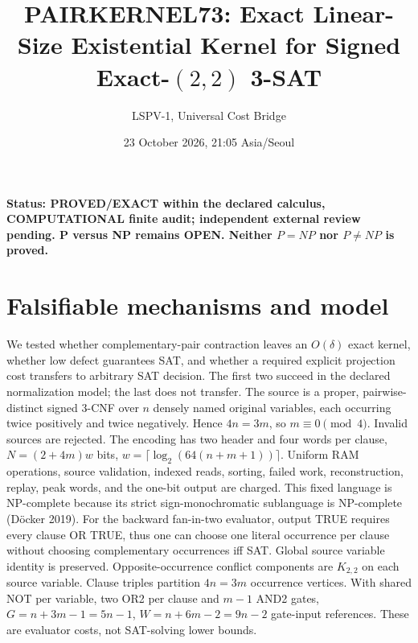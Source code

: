 \documentclass[11pt]{article}
\title{PAIRKERNEL73: Exact Linear-Size Existential Kernel for Signed Exact-$(2,2)$ 3-SAT}
\author{LSPV-1, Universal Cost Bridge}
\date{23 October 2026, 21:05 Asia/Seoul}
\begin{document}
\maketitle
\noindent\textbf{Status: PROVED/EXACT within the declared calculus, COMPUTATIONAL finite audit; independent external review pending. P versus NP remains OPEN. Neither $P=NP$ nor $P\ne NP$ is proved.}

\section{Falsifiable mechanisms and model}
We tested whether complementary-pair contraction leaves an $O(\delta)$ exact kernel, whether low defect guarantees SAT, and whether a required explicit projection cost transfers to arbitrary SAT decision. The first two succeed in the declared normalization model; the last does not transfer.
The source is a proper, pairwise-distinct signed 3-CNF over $n$ densely named original variables, each occurring twice positively and twice negatively. Hence $4n=3m$, so $m\equiv0\pmod4$. Invalid sources are rejected. The encoding has two header and four words per clause, $N=(2+4m)w$ bits, $w=\lceil\log_2(64(n+m+1))\rceil$. Uniform RAM operations, source validation, indexed reads, sorting, failed work, reconstruction, replay, peak words, and the one-bit output are charged. This fixed language is NP-complete because its strict sign-monochromatic sublanguage is NP-complete (D\"ocker 2019).
For the backward fan-in-two evaluator, output TRUE requires every clause OR TRUE, thus one can choose one literal occurrence per clause without choosing complementary occurrences iff SAT. Global source variable identity is preserved. Opposite-occurrence conflict components are $K_{2,2}$ on each source variable. Clause triples partition $4n=3m$ occurrence vertices. With shared NOT per variable, two OR2 per clause and $m-1$ AND2 gates, $G=n+3m-1=5n-1$, $W=n+6m-2=9n-2$ gate-input references. These are evaluator costs, not SAT-solving lower bounds.
\end{document}
